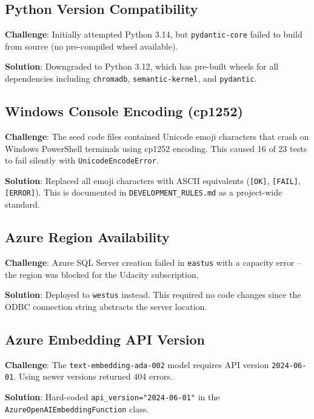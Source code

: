 \documentclass[12pt,a4paper]{article}
\begin{document}
\subsection{Python Version Compatibility}

\textbf{Challenge}: Initially attempted Python 3.14, but \texttt{pydantic-core}
failed to build from source (no pre-compiled wheel available).

\textbf{Solution}: Downgraded to Python 3.12, which has pre-built wheels for all
dependencies including \texttt{chromadb}, \texttt{semantic-kernel}, and \texttt{pydantic}.

\subsection{Windows Console Encoding (cp1252)}

\textbf{Challenge}: The seed code files contained Unicode emoji characters that
crash on Windows PowerShell terminals using cp1252 encoding. This caused 16 of
23 tests to fail silently with \texttt{UnicodeEncodeError}.

\textbf{Solution}: Replaced all emoji characters with ASCII equivalents
(\texttt{[OK]}, \texttt{[FAIL]}, \texttt{[ERROR]}). This is documented in
\texttt{DEVELOPMENT\_RULES.md} as a project-wide standard.

\subsection{Azure Region Availability}

\textbf{Challenge}: Azure SQL Server creation failed in \texttt{eastus} with a
capacity error -- the region was blocked for the Udacity subscription.

\textbf{Solution}: Deployed to \texttt{westus} instead. This required no code changes
since the ODBC connection string abstracts the server location.

\subsection{Azure Embedding API Version}

\textbf{Challenge}: The \texttt{text-embedding-ada-002} model requires API version
\texttt{2024-06-01}. Using newer versions returned 404 errors.

\textbf{Solution}: Hard-coded \texttt{api\_version="2024-06-01"} in the
\texttt{AzureOpenAIEmbeddingFunction} class.
\end{document}
